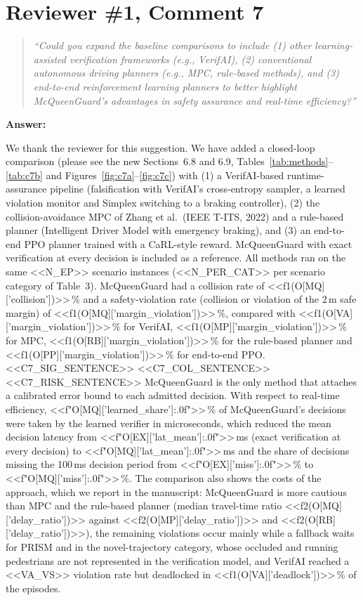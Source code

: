 \documentclass[11pt]{article}
\newenvironment{revcomment}{\begin{quote}\itshape}{\end{quote}}
\newcommand{\answerhead}[1]{\par\medskip\noindent\textbf{#1}\par}
\begin{document}
\section*{Reviewer \#1, Comment 7}
\begin{revcomment}
``Could you expand the baseline comparisons to include (1) other learning-assisted verification frameworks (e.g., VerifAI),
(2) conventional autonomous driving planners (e.g., MPC, rule-based methods), and (3) end-to-end reinforcement learning planners
to better highlight McQueenGuard's advantages in safety assurance and real-time efficiency?''
\end{revcomment}
\answerhead{Answer:}
We thank the reviewer for this suggestion. We have added a closed-loop comparison (please see the new Sections~6.8 and 6.9,
Tables~\ref{tab:methods}--\ref{tab:c7b} and Figures~\ref{fig:c7a}--\ref{fig:c7c}) with (1) a VerifAI-based runtime-assurance
pipeline (falsification with VerifAI's cross-entropy sampler, a learned violation monitor and Simplex switching to a braking
controller), (2) the collision-avoidance MPC of Zhang et al.\ (IEEE T-ITS, 2022) and a rule-based planner (Intelligent Driver
Model with emergency braking), and (3) an end-to-end PPO planner trained with a CaRL-style reward. McQueenGuard with exact
verification at every decision is included as a reference. All methods ran on the same <<N_EP>> scenario instances (<<N_PER_CAT>>
per scenario category of Table~3). McQueenGuard had a collision rate of <<f1(O[MQ]['collision'])>>\,\% and a safety-violation rate
(collision or violation of the 2\,m safe margin) of <<f1(O[MQ]['margin_violation'])>>\,\%, compared with
<<f1(O[VA]['margin_violation'])>>\,\% for VerifAI, <<f1(O[MP]['margin_violation'])>>\,\% for MPC, <<f1(O[RB]['margin_violation'])>>\,\%
for the rule-based planner and <<f1(O[PP]['margin_violation'])>>\,\% for end-to-end PPO. <<C7_SIG_SENTENCE>> <<C7_COL_SENTENCE>> <<C7_RISK_SENTENCE>> McQueenGuard is the only method that attaches a
calibrated error bound to each admitted decision. With respect to
real-time efficiency, <<f"{O[MQ]['learned_share']:.0f}">>\,\% of McQueenGuard's decisions were taken by the learned verifier in
microseconds, which reduced the mean decision latency from <<f"{O[EX]['lat_mean']:.0f}">>\,ms (exact verification at every
decision) to <<f"{O[MQ]['lat_mean']:.0f}">>\,ms and the share of decisions missing the 100\,ms decision period from
<<f"{O[EX]['miss']:.0f}">>\,\% to <<f"{O[MQ]['miss']:.0f}">>\,\%. The comparison also shows the costs of the approach, which we
report in the manuscript: McQueenGuard is more cautious than MPC and the rule-based planner (median travel-time ratio
<<f2(O[MQ]['delay_ratio'])>> against <<f2(O[MP]['delay_ratio'])>> and <<f2(O[RB]['delay_ratio'])>>), the remaining
violations occur mainly while a fallback waits for PRISM and in the novel-trajectory category, whose occluded and running
pedestrians are not represented in the verification model, and VerifAI reached a <<VA_VS>> violation rate but deadlocked in
<<f1(O[VA]['deadlock'])>>\,\% of the episodes.
\end{document}

